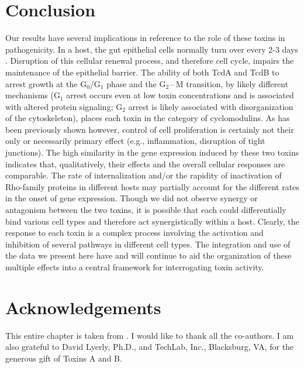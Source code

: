 \section{Conclusion}
Our results have several implications in reference to the 
role of these toxins in pathogenicity. In a host, the gut 
epithelial cells normally turn over every 2-3 days 
\cite{Kim:2010ja}. Disruption of this cellular renewal 
process, and therefore cell cycle, impairs the 
maintenance of the epithelial barrier. The ability of 
both TcdA and TcdB to arrest growth at the 
G$_{\text{0}}$/G$_{\text{1}}$ phase and the 
G$_{\text{2}}$\,--\,M transition, by likely different 
mechanisms (G$_{\text{1}}$ arrest occurs even at low 
toxin concentrations and is associated with altered 
protein signaling; G$_{\text{2}}$ arrest is likely 
associated with disorganization of the cytoskeleton), 
places each toxin in the category of cyclomodulins. 
As has been previously shown however, control of 
cell proliferation is certainly not their only or 
necessarily primary effect (e.g., inflammation, 
disruption of tight junctions). The high similarity 
in the gene expression induced by these two toxins 
indicates that, qualitatively, their effects and 
the overall cellular responses are comparable. The 
rate of internalization and/or the rapidity of 
inactivation of Rho-family proteins in different 
hosts may partially account for the different 
rates in the onset of gene expression. Though we did 
not observe synergy or antagonism between the two 
toxins, it is possible that each could differentially 
bind various cell types and therefore act synergistically 
within a host. Clearly, the response to each toxin 
is a complex process involving the activation and 
inhibition of several pathways in different cell 
types. The integration and use of the data we present 
here have and will continue to aid the organization 
of these multiple effects into a central framework 
for interrogating toxin activity.

\section{Acknowledgements}
This entire chapter is taken from 
.
I would like to thank all the co-authors. I am
also  grateful to David Lyerly, Ph.D., and 
TechLab, Inc., Blacksburg, VA, for the generous gift 
of Toxins A and B.




\finishsupplement







